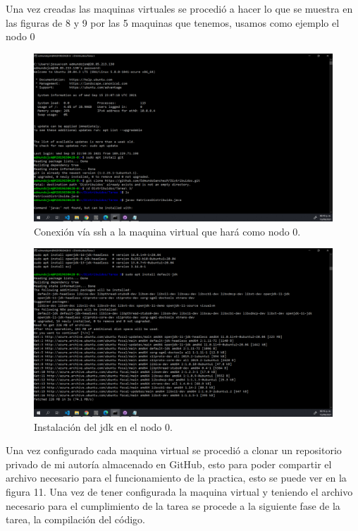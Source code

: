 \documentclass[11pt]{article}
\begin{document}
Una vez creadas las maquinas virtuales se procedió a hacer lo que se muestra en las figuras de 8 y 9 por las 5 maquinas que tenemos, usamos como ejemplo el nodo 0
		\begin{figure}[H]
			\centering
			\includegraphics[scale=0.34]{resources/Nodo0ssh.png}
			\caption{Conexión vía ssh a la maquina virtual que hará como nodo 0. }\label{fig:picture}
		\end{figure}
		\begin{figure}[H]
			\centering
			\includegraphics[scale=0.34]{resources/instalarjava.png}
			\caption{Instalación del jdk en el nodo 0. }\label{fig:picture}
		\end{figure}
		Una vez configurado cada maquina virtual se procedió a clonar un repositorio privado de mi autoría almacenado en GitHub, esto para poder compartir el archivo necesario para el funcionamiento de la practica, esto se puede ver en la figura 11. Una vez de tener configurada la maquina virtual y teniendo el archivo necesario para el cumplimiento de la tarea se procede a la siguiente fase de la tarea, la compilación del código.
\end{document}
